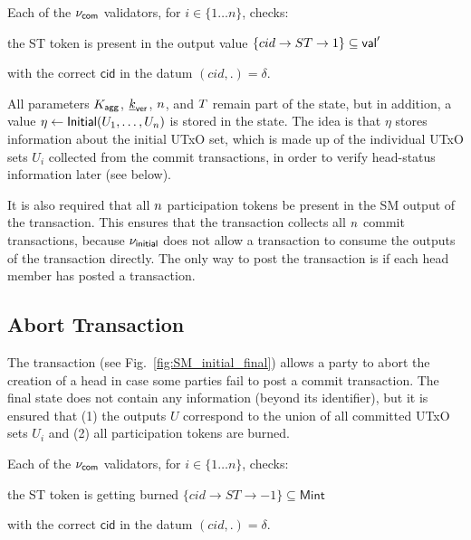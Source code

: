 Each of the $\nu_\mathsf{com}$ validators, for $i \in \{ 1\dots n\}$, checks:
    \begin{menumerate}
      \item the ST token is present in the output value $\{cid \rightarrow ST \rightarrow 1\} \subseteq \mathsf{val}'$
      \item with the correct $\mathsf{cid}$ in the datum $(cid,.) = \delta$.
    \end{menumerate}


All parameters $K_{\mathsf{agg}}$, $\underline{k}_{\mathsf{ver}}$, $n$, and $T$ remain part of the state,
but in addition, a value $\eta \gets \mathsf{Initial}(U_1,\ldots,U_n)$ is stored in
the state. The idea is that $\eta$ stores information about the initial UTxO
set, which is made up of the individual UTxO sets $U_i$ collected from the
commit transactions, in order to verify head-status information later (see
below).

It is also required that all $n$ participation tokens be present in the SM
output of the \mtxCollect{} transaction. This ensures that the \mtxCollect{}
transaction collects all $n$ commit transactions, because $\nu_\mathsf{initial}$ does
not allow a \mtxCollect{} transaction to consume the outputs of the \mtxInit{}
transaction directly. The only way to post the \mtxCollect{} transaction is if
each head member has posted a \mtxCommit{} transaction.



\subsection{Abort Transaction}\label{sec:abort-tx} 

The \mtxAbort{} transaction
(see Fig.~\ref{fig:SM_initial_final}) allows a party to abort the
creation of a head in case some parties fail to post a commit
transaction.  The final state does not contain any information (beyond
its identifier), but it is ensured that (1) the outputs $U$ correspond
to the union of all committed UTxO sets $U_i$ and (2) all
participation tokens are burned.

Each of the $\nu_\mathsf{com}$ validators, for $i \in \{ 1\dots n\}$, checks:

\begin{menumerate}
  \item the ST token is getting burned $\{cid \rightarrow ST \rightarrow -1\} \subseteq \mathsf{Mint}$
  \item with the correct $\mathsf{cid}$ in the datum $(cid,.) = \delta$.
\end{menumerate}


